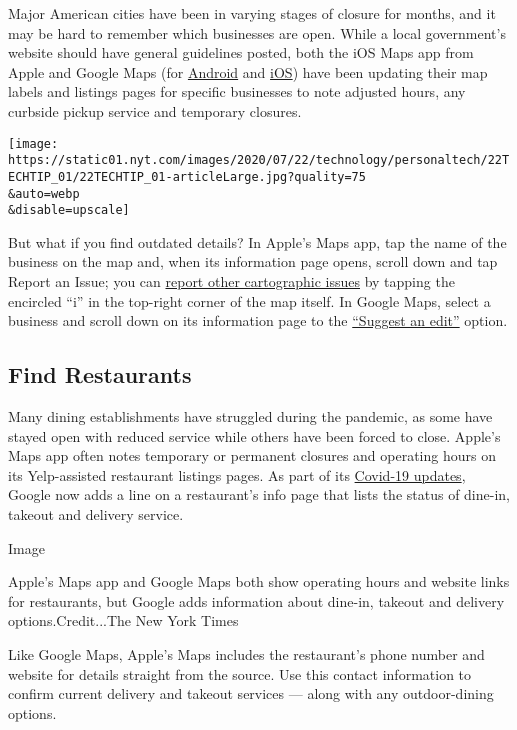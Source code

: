 Major American cities have been in varying stages of closure for months,
and it may be hard to remember which businesses are open. While a local
government's website should have general guidelines posted, both the iOS
Maps app from Apple and Google Maps (for
\href{https://play.google.com/store/apps/details?id=com.google.android.apps.maps\&hl=en_US}{Android}
and
\href{https://apps.apple.com/us/app/google-maps-transit-food/id585027354}{iOS})
have been updating their map labels and listings pages for specific
businesses to note adjusted hours, any curbside pickup service and
temporary closures.

\texttt{[image: https://static01.nyt.com/images/2020/07/22/technology/personaltech/22TECHTIP\_01/22TECHTIP\_01-articleLarge.jpg?quality=75\\\&auto=webp\\\&disable=upscale]}

But what if you find outdated details? In Apple's Maps app, tap the name
of the business on the map and, when its information page opens, scroll
down and tap Report an Issue; you can
\href{https://support.apple.com/en-us/HT203080}{report other
cartographic issues} by tapping the encircled ``i'' in the top-right
corner of the map itself. In Google Maps, select a business and scroll
down on its information page to the
\href{https://support.google.com/local-guides/answer/7084895?co=GENIE.Platform\%3DAndroid\&hl=en-GB\&oco=1}{``Suggest
an edit''} option.

\hypertarget{find-restaurants}{%
\subsection{Find Restaurants}\label{find-restaurants}}

Many dining establishments have struggled during the pandemic, as some
have stayed open with reduced service while others have been forced to
close. Apple's Maps app often notes temporary or permanent closures and
operating hours on its Yelp-assisted restaurant listings pages. As part
of its \href{https://support.google.com/maps/answer/9795160}{Covid-19
updates}, Google now adds a line on a restaurant's info page that lists
the status of dine-in, takeout and delivery service.

Image

Apple's Maps app and Google Maps both show operating hours and website
links for restaurants, but Google adds information about dine-in,
takeout and delivery options.Credit...The New York Times

Like Google Maps, Apple's Maps includes the restaurant's phone number
and website for details straight from the source. Use this contact
information to confirm current delivery and takeout services --- along
with any outdoor-dining options.

